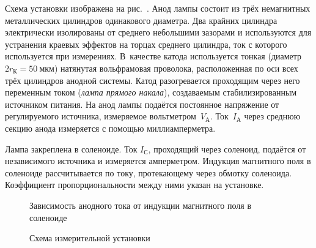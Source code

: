 Схема установки изображена на рис.~. 
Анод лампы состоит из трёх немагнитных металлических 
цилиндров одинакового диаметра.
Два крайних цилиндра электрически изолированы от среднего небольшими зазорами и
используются для устранения краевых эффектов на торцах среднего цилиндра, ток с
которого используется при измерениях. В~качестве катода используется тонкая
(диаметр $2r_{К}=50~\text{мкм}$) натянутая вольфрамовая проволока, расположенная по оси
всех трёх цилиндров анодной системы. Катод разогревается проходящим 
через него переменным током (\emph{лампа прямого накала}),
создаваемым стабилизированным источником питания. 
На анод лампы подаётся постоянное напряжение от регулируемого источника, 
измеряемое вольтметром~$V_{А}$. Ток~$I_{А}$ через среднюю секцию анода  
измеряется с помощью миллиамперметра.

Лампа закреплена в соленоиде. Ток $I_{С}$, проходящий через соленоид, подаётся от
независимого источника и измеряется амперметром. Индукция магнитного поля в
соленоиде рассчитывается по току, протекающему через обмотку соленоида.
Коэффициент пропорциональности между ними указан на установке.


\begin{figure}[h!]
    \centering
    \caption{Зависимость анодного тока от индукции магнитного поля в соленоиде}
\end{figure}

\begin{figure}[h!]
    \centering
    \caption{Схема измерительной установки}
\end{figure}


